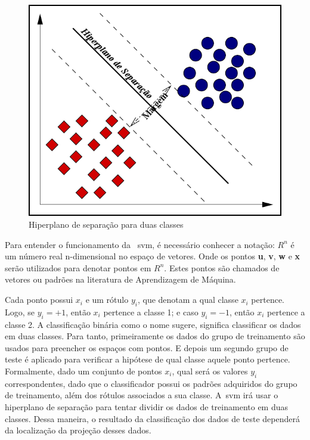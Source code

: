 \begin{figure}
 \centering
 \includegraphics[scale=0.4]{./img/svmhyperplane.png}
\caption{Hiperplano de separação para duas classes}
 \label{fig:hiperplano}
\end{figure}


Para entender o funcionamento da ~\ac{svm}, é necessário conhecer a notação:
\begin{math}
R^{n}
\end{math}
é um número real n-dimensional no espaço de vetores. Onde os pontos \textbf{u}, \textbf{v}, \textbf{w} e \textbf{x} serão utilizados para denotar pontos em 
\begin{math}
R^{n}
\end{math}.
Estes pontos são chamados de vetores ou padrões na literatura de Aprendizagem de Máquina.

Cada ponto possui $x_{i}$ e um rótulo $y_{i}$, que denotam a qual classe $x_{i}$ pertence. Logo, se $y_{i} = + 1$, então $x_{i}$ pertence a classe 1; e caso $y_{i} = - 1$, então $x_{i}$ pertence a classe 2. A classificação binária como o nome sugere, significa classificar os dados em duas classes. Para tanto, primeiramente os dados do grupo de treinamento são usados para preencher os espaços com pontos. E depois um segundo grupo de teste é aplicado para verificar a hipótese de qual classe aquele ponto pertence. Formalmente, dado um conjunto de pontos $x_{i}$, qual será os valores $y_{i}$ correspondentes, dado que o classificador possui os padrões adquiridos do grupo de treinamento, além dos rótulos associados a sua classe. A~\ac{svm} irá usar o hiperplano de separação para tentar dividir os dados de treinamento em duas classes. Dessa maneira, o resultado da classificação dos dados de teste dependerá da localização da projeção desses dados.

